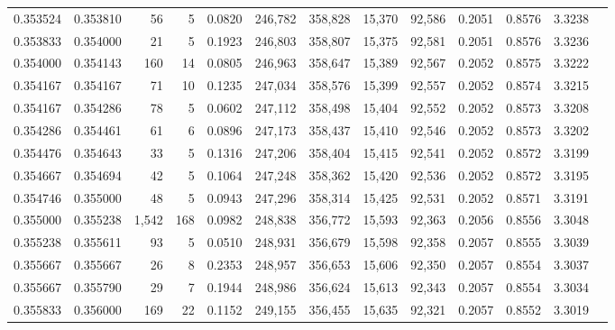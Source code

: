 \begin{tabular}{rrrrrrrrrrrrr}
0.353524 & 0.353810 &    56 &   5 &                                     0.0820 & 246,782 & 358,828 &  15,370 &  92,586 & 0.2051 & 0.8576 & 3.3238 \\
0.353833 & 0.354000 &    21 &   5 &                                     0.1923 & 246,803 & 358,807 &  15,375 &  92,581 & 0.2051 & 0.8576 & 3.3236 \\
0.354000 & 0.354143 &   160 &  14 &                                     0.0805 & 246,963 & 358,647 &  15,389 &  92,567 & 0.2052 & 0.8575 & 3.3222 \\
0.354167 & 0.354167 &    71 &  10 &                                     0.1235 & 247,034 & 358,576 &  15,399 &  92,557 & 0.2052 & 0.8574 & 3.3215 \\
0.354167 & 0.354286 &    78 &   5 &                                     0.0602 & 247,112 & 358,498 &  15,404 &  92,552 & 0.2052 & 0.8573 & 3.3208 \\
0.354286 & 0.354461 &    61 &   6 &                                     0.0896 & 247,173 & 358,437 &  15,410 &  92,546 & 0.2052 & 0.8573 & 3.3202 \\
0.354476 & 0.354643 &    33 &   5 &                                     0.1316 & 247,206 & 358,404 &  15,415 &  92,541 & 0.2052 & 0.8572 & 3.3199 \\
0.354667 & 0.354694 &    42 &   5 &                                     0.1064 & 247,248 & 358,362 &  15,420 &  92,536 & 0.2052 & 0.8572 & 3.3195 \\
0.354746 & 0.355000 &    48 &   5 &                                     0.0943 & 247,296 & 358,314 &  15,425 &  92,531 & 0.2052 & 0.8571 & 3.3191 \\
0.355000 & 0.355238 & 1,542 & 168 &                                     0.0982 & 248,838 & 356,772 &  15,593 &  92,363 & 0.2056 & 0.8556 & 3.3048 \\
0.355238 & 0.355611 &    93 &   5 &                                     0.0510 & 248,931 & 356,679 &  15,598 &  92,358 & 0.2057 & 0.8555 & 3.3039 \\
0.355667 & 0.355667 &    26 &   8 &                                     0.2353 & 248,957 & 356,653 &  15,606 &  92,350 & 0.2057 & 0.8554 & 3.3037 \\
0.355667 & 0.355790 &    29 &   7 &                                     0.1944 & 248,986 & 356,624 &  15,613 &  92,343 & 0.2057 & 0.8554 & 3.3034 \\
0.355833 & 0.356000 &   169 &  22 &                                     0.1152 & 249,155 & 356,455 &  15,635 &  92,321 & 0.2057 & 0.8552 & 3.3019 \\

\end{tabular}
